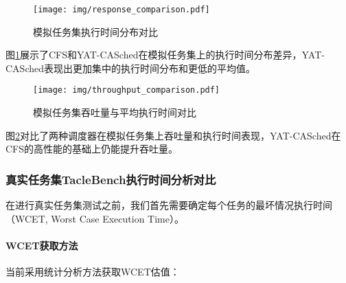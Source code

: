 \begin{figure}[H]
\centering
\texttt{[image: img/response\_comparison.pdf]}
\caption{模拟任务集执行时间分布对比}
\label{fig:synthetic-response}
\end{figure}

图\ref{fig:synthetic-response}展示了CFS和YAT-CASched在模拟任务集上的执行时间分布差异，YAT-CASched表现出更加集中的执行时间分布和更低的平均值。

\begin{figure}[H]
\centering
\texttt{[image: img/throughput\_comparison.pdf]}
\caption{模拟任务集吞吐量与平均执行时间对比}
\label{fig:synthetic-throughput}
\end{figure}

图\ref{fig:synthetic-throughput}对比了两种调度器在模拟任务集上吞吐量和执行时间表现，YAT-CASched在CFS的高性能的基础上仍能提升吞吐量。

\subsubsection{真实任务集TacleBench执行时间分析对比}

在进行真实任务集测试之前，我们首先需要确定每个任务的最坏情况执行时间（WCET, Worst Case Execution Time）。

\paragraph{WCET获取方法}

当前采用统计分析方法获取WCET估值：

